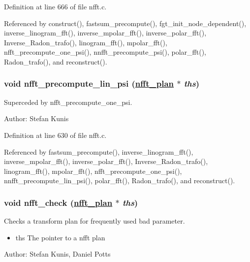 Definition at line 666 of file nfft.c.

Referenced by construct(), fastsum\_\-precompute(), fgt\_\-init\_\-node\_\-dependent(), inverse\_\-linogram\_\-fft(), inverse\_\-mpolar\_\-fft(), inverse\_\-polar\_\-fft(), Inverse\_\-Radon\_\-trafo(), linogram\_\-fft(), mpolar\_\-fft(), nfft\_\-precompute\_\-one\_\-psi(), nnfft\_\-precompute\_\-psi(), polar\_\-fft(), Radon\_\-trafo(), and reconstruct().\hypertarget{group__nfft_ga13}{
\subsubsection[nfft\_\-precompute\_\-lin\_\-psi]{\setlength{\rightskip}{0pt plus 5cm}void nfft\_\-precompute\_\-lin\_\-psi (\hyperlink{structnfft__plan}{nfft\_\-plan} $\ast$ {\em ths})}}
\label{group__nfft_ga13}


Superceded by nfft\_\-precompute\_\-one\_\-psi. 

\begin{Desc}
\item[Author:]Stefan Kunis \end{Desc}


Definition at line 630 of file nfft.c.

Referenced by fastsum\_\-precompute(), inverse\_\-linogram\_\-fft(), inverse\_\-mpolar\_\-fft(), inverse\_\-polar\_\-fft(), Inverse\_\-Radon\_\-trafo(), linogram\_\-fft(), mpolar\_\-fft(), nfft\_\-precompute\_\-one\_\-psi(), nnfft\_\-precompute\_\-lin\_\-psi(), polar\_\-fft(), Radon\_\-trafo(), and reconstruct().\hypertarget{group__nfft_ga14}{
\subsubsection[nfft\_\-check]{\setlength{\rightskip}{0pt plus 5cm}void nfft\_\-check (\hyperlink{structnfft__plan}{nfft\_\-plan} $\ast$ {\em ths})}}
\label{group__nfft_ga14}


Checks a transform plan for frequently used bad parameter. 

\begin{itemize}
\item ths The pointer to a nfft plan\end{itemize}
\begin{Desc}
\item[Author:]Stefan Kunis, Daniel Potts \end{Desc}


